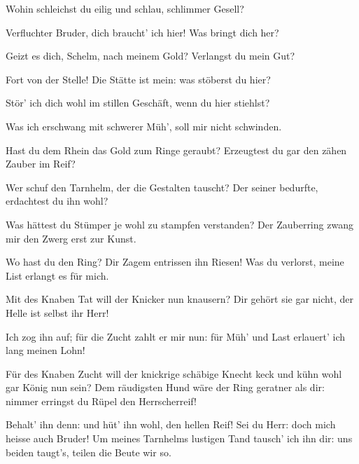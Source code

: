 \begin{drama}
\Alberichspeaks

Wohin schleichst du
eilig und schlau,
schlimmer Gesell?

\Mimespeaks

Verfluchter Bruder,
dich braucht' ich hier!
Was bringt dich her?

\Alberichspeaks

Geizt es dich, Schelm,
nach meinem Gold?
Verlangst du mein Gut?

\Mimespeaks

Fort von der Stelle!
Die Stätte ist mein:
was stöberst du hier?

\Alberichspeaks

Stör' ich dich wohl
im stillen Geschäft,
wenn du hier stiehlst?

\Mimespeaks

Was ich erschwang
mit schwerer Müh',
soll mir nicht schwinden.

\Alberichspeaks

Hast du dem Rhein
das Gold zum Ringe geraubt?
Erzeugtest du gar
den zähen Zauber im Reif?

\Mimespeaks

Wer schuf den Tarnhelm,
der die Gestalten tauscht?
Der seiner bedurfte,
erdachtest du ihn wohl?

\Alberichspeaks

Was hättest du Stümper
je wohl zu stampfen verstanden?
Der Zauberring
zwang mir den Zwerg erst zur Kunst.

\Mimespeaks

Wo hast du den Ring?
Dir Zagem entrissen ihn Riesen!
Was du verlorst,
meine List erlangt es für mich.

\Alberichspeaks

Mit des Knaben Tat
will der Knicker nun knausern?
Dir gehört sie gar nicht,
der Helle ist selbst ihr Herr!

\Mimespeaks

Ich zog ihn auf;
für die Zucht zahlt er mir nun:
für Müh' und Last
erlauert' ich lang meinen Lohn!

\Alberichspeaks

Für des Knaben Zucht
will der knickrige
schäbige Knecht
keck und kühn
wohl gar König nun sein?
Dem räudigsten Hund
wäre der Ring
geratner als dir:
nimmer erringst
du Rüpel den Herrscherreif!

\Mimespeaks


Behalt' ihn denn:
und hüt' ihn wohl,
den hellen Reif!
Sei du Herr:
doch mich heisse auch Bruder!
Um meines Tarnhelms
lustigen Tand
tausch' ich ihn dir:
uns beiden taugt's,
teilen die Beute wir so.


\end{drama}
